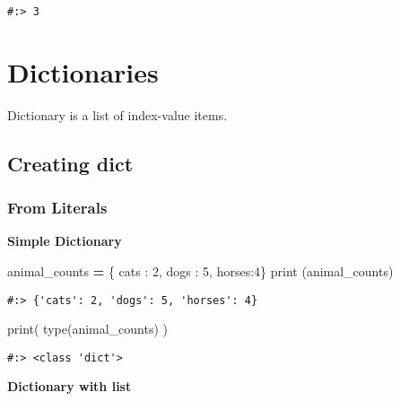 \documentclass[
]{book}
\newenvironment{Shaded}{\begin{snugshade}}{\end{snugshade}}
\newcommand{\BuiltInTok}[1]{#1}
\newcommand{\DecValTok}[1]{\textcolor[rgb]{0.06,0.06,0.06}{#1}}
\newcommand{\NormalTok}[1]{#1}
\newcommand{\OperatorTok}[1]{\textcolor[rgb]{0.43,0.43,0.43}{\textbf{#1}}}
\newcommand{\StringTok}[1]{\textcolor[rgb]{0.5,0.5,0.5}{#1}}
\begin{document}
\begin{verbatim}
#:> 3
\end{verbatim}

\hypertarget{dictionaries}{%
\section{Dictionaries}\label{dictionaries}}

Dictionary is a list of index-value items.

\hypertarget{creating-dict}{%
\subsection{Creating dict}\label{creating-dict}}

\hypertarget{from-literals}{%
\subsubsection{From Literals}\label{from-literals}}

\textbf{Simple Dictionary}

\begin{Shaded}
\begin{Highlighting}[]
\NormalTok{animal\_counts }\OperatorTok{=}\NormalTok{ \{ }\StringTok{\textquotesingle{}cats\textquotesingle{}}\NormalTok{ : }\DecValTok{2}\NormalTok{, }\StringTok{\textquotesingle{}dogs\textquotesingle{}}\NormalTok{ : }\DecValTok{5}\NormalTok{, }\StringTok{\textquotesingle{}horses\textquotesingle{}}\NormalTok{:}\DecValTok{4}\NormalTok{\}}
\BuiltInTok{print}\NormalTok{ (animal\_counts)}
\end{Highlighting}
\end{Shaded}

\begin{verbatim}
#:> {'cats': 2, 'dogs': 5, 'horses': 4}
\end{verbatim}

\begin{Shaded}
\begin{Highlighting}[]
\BuiltInTok{print}\NormalTok{( }\BuiltInTok{type}\NormalTok{(animal\_counts) )}
\end{Highlighting}
\end{Shaded}

\begin{verbatim}
#:> <class 'dict'>
\end{verbatim}

\textbf{Dictionary with list}
\end{document}
